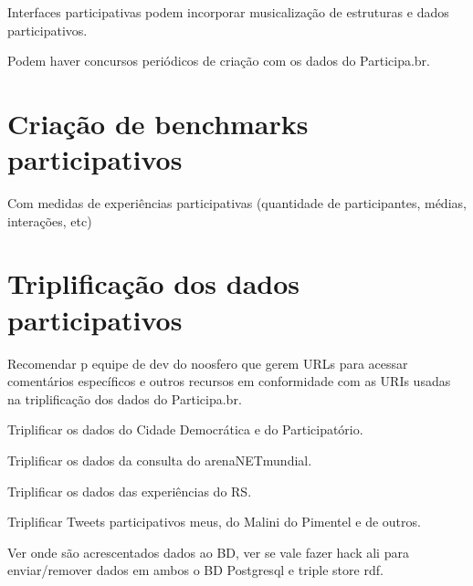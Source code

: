 \documentclass[12pt]{report}
\begin{document}
Interfaces participativas podem incorporar musicalização de estruturas e dados participativos.

Podem haver concursos periódicos de criação com os dados do Participa.br.
\chapter{Criação de benchmarks participativos}
Com medidas de experiências participativas (quantidade de participantes, médias, interações, etc)

\chapter{Triplificação dos dados participativos}
Recomendar p equipe de dev do noosfero que gerem URLs para acessar comentários específicos e outros recursos em conformidade com as URIs usadas na triplificação dos dados do Participa.br.

Triplificar os dados do Cidade Democrática e do Participatório.

Triplificar os dados da consulta do arenaNETmundial.

Triplificar os dados das experiências do RS.

Triplificar Tweets participativos meus, do Malini do Pimentel e de outros.

Ver onde são acrescentados dados ao BD, ver se vale fazer hack ali para enviar/remover dados em ambos o BD Postgresql e triple store rdf.
\end{document}
